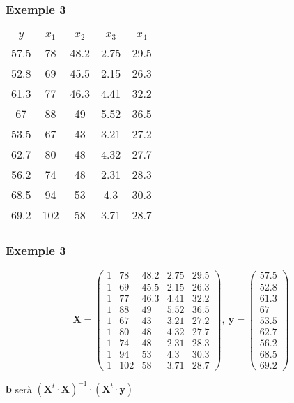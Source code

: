 \documentclass[12pt,t]{beamer}
\theoremstyle{plain}
\theoremstyle{definition}
\begin{document}
\begin{frame}
\frametitle{Exemple 3}

\begin{center}\begin{tabular}{|c|c|c|c|c|}\hline
$y$ & $x_1$ & $x_2$ & $x_3$ & $x_4$\\\hline
57.5&78&48.2&2.75&29.5\\ 52.8&69&45.5&2.15&26.3\\
61.3&77&46.3&4.41&32.2\\ 67&88&49&5.52&36.5\\ 53.5&67&43&3.21&27.2\\
62.7&80&48&4.32&27.7\\ 56.2&74&48&2.31&28.3\\ 68.5&94&53&4.3&30.3\\
69.2&102&58&3.71&28.7\\\hline\end{tabular}\end{center}

\end{frame}

\begin{frame}
\frametitle{Exemple 3}
$$
\mathbf{X}=\left(
\begin{array}{ccccc}
1&78&48.2&2.75&29.5\\
1&69&45.5&2.15&26.3\\
1&77&46.3&4.41&32.2\\
1&88&49&5.52&36.5\\
1&67&43&3.21&27.2\\
1&80&48&4.32&27.7\\
1&74&48&2.31&28.3\\
1&94&53&4.3&30.3\\
1&102&58&3.71&28.7
\end{array}
\right),\
\mathbf{y}=\left(
\begin{array}{c}
57.5\\ 52.8\\ 61.3\\ 67\\ 53.5\\ 62.7\\ 56.2\\ 68.5\\ 69.2
\end{array}
\right)
$$
\medskip
\begin{center}
$\mathbf{b}$ serà $\left(\mathbf{X}^t\cdot \mathbf{X}
\right)^{-1}\cdot \left(\mathbf{X}^t \cdot \mathbf{y}\right)$
\end{center}
\end{frame}
\end{document}
